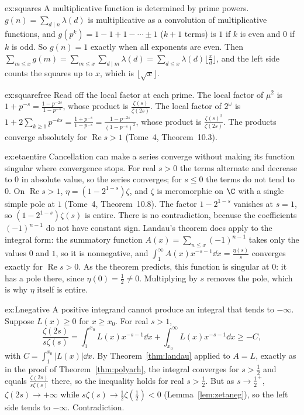 \begin{solution}{ex:squares}
\idea A multiplicative function is determined by prime powers.
\writeup $g(n)=\sum_{d\mid n}\lambda(d)$ is multiplicative as a convolution of multiplicative functions, and $g(p^k)=1-1+1-\cdots\pm1$ ($k+1$ terms) is $1$ if $k$ is
even and $0$ if $k$ is odd. So $g(n)=1$ exactly when all exponents are even. Then $\sum_{m\le x}g(m)=\sum_{m\le x}\sum_{d\mid m}\lambda(d)=\sum_{d\le x}\lambda(d)\lfloor\frac xd\rfloor$,
and the left side counts the squares up to $x$, which is $\lfloor\sqrt x\rfloor$.
\end{solution}

\begin{solution}{ex:squarefree}
\idea Read off the local factor at each prime.
\writeup The local factor of $\mu^2$ is $1+p^{-s}=\frac{1-p^{-2s}}{1-p^{-s}}$, whose product is $\frac{\zeta(s)}{\zeta(2s)}$. The local factor of $2^\omega$ is
$1+2\sum_{k\ge1}p^{-ks}=\frac{1+p^{-s}}{1-p^{-s}}=\frac{1-p^{-2s}}{(1-p^{-s})^2}$, whose product is $\frac{\zeta(s)^2}{\zeta(2s)}$. The products converge absolutely for
$\operatorname{Re}s>1$ (Tome~4, Theorem~10.3).
\end{solution}

\begin{solution}{ex:etaentire}
\idea Cancellation can make a series converge without making its function singular where convergence stops.
\writeup For real $s>0$ the terms alternate and decrease to $0$ in absolute value, so the series converges; for $s\le0$ the terms do not tend to $0$. On
$\operatorname{Re}s>1$, $\eta=(1-2^{1-s})\zeta$, and $\zeta$ is meromorphic on $\C$ with a single simple pole at $1$ (Tome~4, Theorem~10.8). The factor $1-2^{1-s}$
vanishes at $s=1$, so $(1-2^{1-s})\zeta(s)$ is entire. There is no contradiction, because the coefficients $(-1)^{n-1}$ do not have constant sign. Landau's theorem
does apply to the integral form: the summatory function $A(x)=\sum_{n\le x}(-1)^{n-1}$ takes only the values $0$ and $1$, so it is nonnegative, and
$\int_1^\infty A(x)x^{-s-1}\dd x=\frac{\eta(s)}s$ converges exactly for $\operatorname{Re}s>0$. As the theorem predicts, this function is singular at $0$: it has a
pole there, since $\eta(0)=\frac12\ne0$. Multiplying by $s$ removes the pole, which is why $\eta$ itself is entire.
\end{solution}

\begin{solution}{ex:Lnegative}
\idea A positive integrand cannot produce an integral that tends to $-\infty$.
\writeup Suppose $L(x)\ge0$ for $x\ge x_0$. For real $s>1$,
\[
\frac{\zeta(2s)}{s\zeta(s)}=\int_1^{x_0}L(x)x^{-s-1}\dd x+\int_{x_0}^\infty L(x)x^{-s-1}\dd x\ge-C,
\]
with $C=\int_1^{x_0}|L(x)|\dd x$. By Theorem~\ref{thm:landau} applied to $A=L$, exactly as in the proof of Theorem~\ref{thm:polyarh}, the integral converges for
$s>\frac12$ and equals $\frac{\zeta(2s)}{s\zeta(s)}$ there, so the inequality holds for real $s>\frac12$. But as $s\to\frac12^+$, $\zeta(2s)\to+\infty$ while
$s\zeta(s)\to\frac12\zeta(\frac12)<0$ (Lemma~\ref{lem:zetaneg}), so the left side tends to $-\infty$. Contradiction.
\end{solution}


